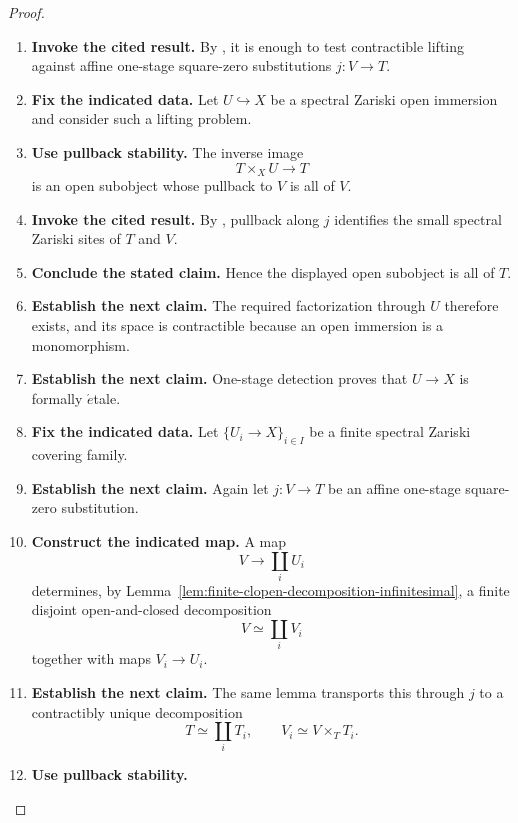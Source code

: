 \begin{proof}
\leavevmode
\begin{enumerate}[label=\textup{(\arabic*)}]
    \item \textbf{Invoke the cited result.}
    By
    , it is enough to test
    contractible lifting against affine one-stage square-zero substitutions
    \(j:V\to T\).
    \item \textbf{Fix the indicated data.}
    Let \(U\hookrightarrow X\) be a spectral Zariski open immersion
    and consider such a lifting problem.
    \item \textbf{Use pullback stability.}
    The inverse image
    \[
    T\times_XU\longrightarrow T
    \]
    is an open subobject whose pullback to \(V\) is all of \(V\).
    \item \textbf{Invoke the cited result.}
    By
    , pullback along \(j\) identifies
    the small spectral Zariski sites of \(T\) and \(V\).
    \item \textbf{Conclude the stated claim.}
    Hence the displayed open
    subobject is all of \(T\).
    \item \textbf{Establish the next claim.}
    The required factorization through \(U\) therefore
    exists, and its space is contractible because an open immersion is a
    monomorphism.
    \item \textbf{Establish the next claim.}
    One-stage detection proves that \(U\to X\) is formally
    \(\acute{e}\)tale.
    \item \textbf{Fix the indicated data.}
    Let \(\{U_i\to X\}_{i\in I}\) be a finite spectral Zariski covering family.
    \item \textbf{Establish the next claim.}
    Again let \(j:V\to T\) be an affine one-stage square-zero substitution.
    \item \textbf{Construct the indicated map.}
    A map
    \[
    V\longrightarrow\coprod_iU_i
    \]
    determines, by
    Lemma~\ref{lem:finite-clopen-decomposition-infinitesimal}, a finite disjoint
    open-and-closed decomposition
    \[
    V\simeq\coprod_iV_i
    \]
    together with maps \(V_i\to U_i\).
    \item \textbf{Establish the next claim.}
    The same lemma transports this through
    \(j\) to a contractibly unique decomposition
    \[
    T\simeq\coprod_iT_i,
    \qquad
    V_i\simeq V\times_TT_i.
    \]
    \item \textbf{Use pullback stability.}

\end{enumerate}
\end{proof}
